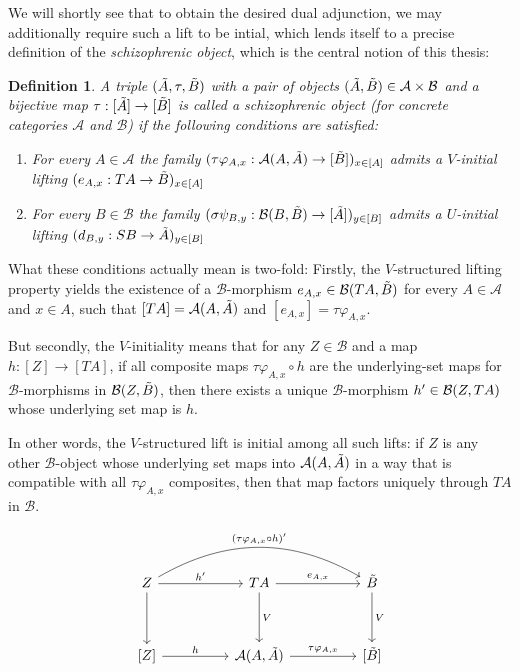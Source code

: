 \documentclass[12pt,a4paper]{article}
\newtheorem{definition}{Definition}[section] %
\def\HomA{\ensuremath\mathcal{A}}
\def\HomB{\ensuremath\mathcal{B}}
\def\t{\ensuremath\tilde}
\begin{document}
We will shortly see that to obtain the desired dual adjunction, we may additionally require such a lift to be intial, which lends itself to a precise definition of the \emph{schizophrenic object}, which is the central notion of this thesis:

\begin{definition}
	A triple $(\t A, \tau, \t B)$ with a pair of objects $(\t A, \t B) \in \mathcal{A} \times \mathcal{B}$ and a bijective map $\tau: [\t A] \to [\t B]$ is called a \emph{schizophrenic object} (for concrete categories $\mathcal{A}$ and $\mathcal{B}$) if the following conditions are satisfied:
\begin{enumerate}
		\item[SO1.] For every $A \in \mathcal{A}$ the family $(\tau\varphi_{A,x}: \HomA(A, \t A) \to [\t B])_{x \in [A]}$ admits a $V$-initial lifting $(e_{A,x}:TA \to \t B)_{x \in [A]}$
		\item[SO2.] For every $B \in \mathcal{B}$ the family $(\sigma\psi_{B,y}: \HomB(B, \t B) \to [\t A])_{y \in [B]}$ admits a $U$-initial lifting $(d_{B,y}:SB \to \t A)_{y \in [B]}$
	\end{enumerate}
\end{definition}

What these conditions actually mean is two-fold: Firstly, the $V$-structured lifting property yields the existence of  a $\mathcal{B}$-morphism $e_{A,x} \in \HomB(TA, \t B)$ for every $A \in \mathcal{A}$ and $x \in A$, such that $[TA] = \HomA(A, \t A)$ and $[e_{A,x}] = \tau \varphi_{A,x}$.

But secondly,  the $V$-initiality means that for any $Z \in \mathcal{B}$ and a map $h: [Z] \to [TA]$, if  all composite maps $\tau \varphi_{A,x} \circ h$ are the underlying-set maps for $\mathcal{B}$-morphisms in $\HomB(Z, \t B)$, then there exists a unique $\mathcal{B}$-morphism $h' \in \HomB(Z, TA)$  whose underlying set map is $h$.

In other words, the $V$-structured lift is initial among all such lifts: if $Z$ is any other $\mathcal{B}$-object whose underlying set maps into $\HomA(A, \t A)$ in a way that is compatible with all $\tau \varphi_{A,x}$ composites, then that map factors uniquely through $TA$ in $\mathcal{B}$. 



\[\begin{tikzcd}
	Z && TA && {\t B} \\
	\\
	{[Z]} && {\HomA(A, \t A)} && {[\t B]}
	\arrow["h'", from=1-1, to=1-3]
	\arrow["{ ({\tau\varphi_{A,x}\circ h})'}", bend left, from=1-1, to=1-5]
	\arrow[from=1-1, to=3-1]
	\arrow["{e_{A,x}}", from=1-3, to=1-5]
	\arrow["V", from=1-3, to=3-3]
	\arrow["V", from=1-5, to=3-5]
	\arrow["h", from=3-1, to=3-3]
	\arrow["{\tau  \varphi_{A,x}}", from=3-3, to=3-5]
\end{tikzcd}\]
\end{document}
